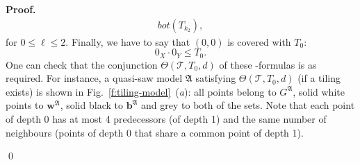 \documentclass{LMCS}
\renewenvironment{proof}{\par\noindent\textbf{Proof.}}{\mbox{}\qed\par\medskip}
\theoremstyle{plain}
\begin{document}
\begin{proof}
\begin{align}
\textit{bot}(T_{k_2}),
\end{align}
for $0 \leq \ell \leq 2$. Finally, we have to say that $(0,0)$ is covered with $T_0$:
\begin{equation}
0_X\cdot 0_Y \leq T_0.
\end{equation}
One can check that the conjunction $\Theta(\mathcal{T},T_0,d)$ of
these \cBCcc{}-formulas is as required. For instance, a quasi-saw
model $\mathfrak{A}$ satisfying $\Theta(\mathcal{T},T_0,d)$ (if a
tiling exists) is shown in Fig.~\ref{f:tiling-model}~(\textit{a}): all points
belong to $G^\mathfrak{A}$, solid white points to
$\mathbf{w}^\mathfrak{A}$, solid black to $\mathbf{b}^\mathfrak{A}$
and grey to both of the sets. Note that each point of
depth 0 has at most 4 predecessors (of depth 1) and the same number of
neighbours (points of depth 0 that share a common point of depth 1).



\end{proof}
\end{document}
